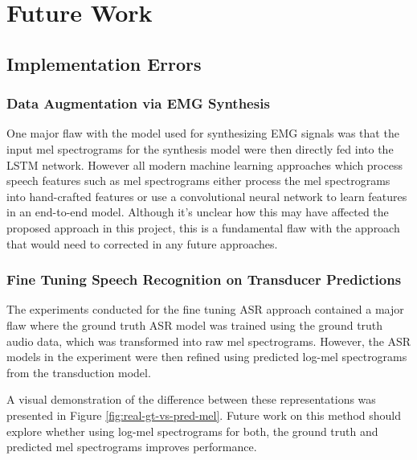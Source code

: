 \chapter{Future Work} \label{chap:future-work}

\section{Implementation Errors}

\subsection{Data Augmentation via EMG Synthesis}

One major flaw with the model used for synthesizing EMG signals
was that the input mel spectrograms for the synthesis model were
then directly fed into the LSTM network. However all modern
machine learning approaches which process speech features such as
mel spectrograms either process the mel spectrograms into hand-crafted
features or use a convolutional neural network to learn features
in an end-to-end model. Although it's unclear how this may have affected
the proposed approach in this project, this is a fundamental flaw with
the approach that would need to corrected in any future approaches.

\subsection{Fine Tuning Speech Recognition on Transducer Predictions}

The experiments conducted for the fine tuning ASR approach contained
a major flaw where the ground truth ASR model was trained using
the ground truth audio data, which was transformed into raw mel spectrograms.
However, the ASR models in the experiment were then
refined using predicted log-mel spectrograms from the transduction model.

A visual demonstration of the difference between these representations
was presented in Figure \ref{fig:real-gt-vs-pred-mel}. Future work
on this method should explore whether using log-mel spectrograms for
both, the ground truth and predicted mel spectrograms improves performance.